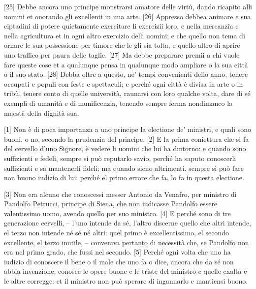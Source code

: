 \quebra

{[}25{]} Debbe ancora uno principe monstrarsi amatore delle virtù, dando
ricapito alli uomini et onorando gli excellenti in una arte. {[}26{]}
Appresso debbea animare e sua ciptadini di potere quietamente exercitare
li exercizii loro, e nella mercanzia e nella agricultura et in ogni
altro exercizio delli uomini; e che quello non tema di ornare le sua
possessione per timore che le gli sia tolta, e quello altro di aprire
uno traffico per paura delle taglie. {[}27{]} Ma debbe preparare premii
a chi vuole fare queste cose et a qualunque pensa in qualunque modo
ampliare o la sua città o il suo stato. {[}28{]} Debba oltre a questo,
ne' tempi convenienti dello anno, tenere occupati e populi con feste e
spettaculi; e perché ogni città è divisa in arte o in tribù, tenere
conto di quelle università, raunarsi con loro qualche volta, dare di sé
exempli di umanità e di munificenzia, tenendo sempre ferma nondimanco la
maestà della dignità sua.


{[}1{]} Non è di poca importanza a uno principe la electione de'
ministri, e quali sono buoni, o no, secondo la prudenzia del principe.
{[}2{]} E la prima coniettura che si fa del cervello d'uno Signore, è
vedere li uomini che lui ha dintorno: e quando sono suffizienti e
fedeli, sempre si può reputarlo savio, perché ha saputo conoscerli
suffizienti e sa mantenerli fideli; ma quando sieno altrimenti, sempre
si può fare non buono iudizio di lui: perché el primo errore che fa, lo
fa in questa electione.

{[}3{]} Non era alcuno che conoscessi messer Antonio da Venafro, per
ministro di Pandolfo Petrucci, principe di Siena, che non iudicasse
Pandolfo essere valentissimo uomo, avendo quello per suo ministro.
{[}4{]} E perché sono di tre generazione cervelli, -- l'uno intende da
sé, l'altro discerne quello che altri intende, el terzo non intende né
sé né altri: quel primo è excellentissimo, el secondo excellente, el
terzo inutile, -- conveniva pertanto di necessità che, se Pandolfo non
era nel primo grado, che fussi nel secondo.
{[}5{]} Perché ogni volta che uno ha iudizio di conoscere il bene o il
male che uno fa o dice, ancora che da sé non abbia invenzione, conosce
le opere buone e le triste del ministro e quelle exalta e le altre
corregge: et il ministro non può sperare di ingannarlo e mantiensi
buono.


